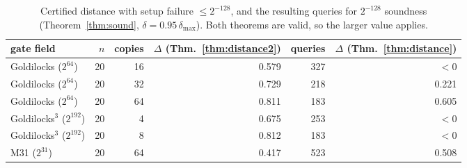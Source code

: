 \documentclass[11pt]{article}
\theoremstyle{definition}
\begin{document}
\begin{table}[h]
\centering
\begin{tabular}{lrrrrr}
\toprule
gate field & $n$ & copies & $\Delta$ (Thm.~\ref{thm:distance2}) & queries & $\Delta$ (Thm.~\ref{thm:distance})\\
\midrule
Goldilocks ($2^{64}$) & 20 & 16 & 0.579 & 327 & $<0$\\
Goldilocks ($2^{64}$) & 20 & 32 & 0.729 & 218 & 0.221\\
Goldilocks ($2^{64}$) & 20 & 64 & 0.811 & 183 & 0.605\\
Goldilocks$^3$ ($2^{192}$) & 20 & 4 & 0.675 & 253 & $<0$\\
Goldilocks$^3$ ($2^{192}$) & 20 & 8 & 0.812 & 183 & $<0$\\
M31 ($2^{31}$) & 20 & 64 & 0.417 & 523 & 0.508\\
\bottomrule
\end{tabular}
\caption{Certified distance with setup failure $\le2^{-128}$, and the resulting queries for
$2^{-128}$ soundness (Theorem~\ref{thm:sound}, $\delta=0.95\,\delta_{\max}$). Both theorems are
valid, so the larger value applies.}
\label{tab:distance2}
\end{table}
\end{document}
